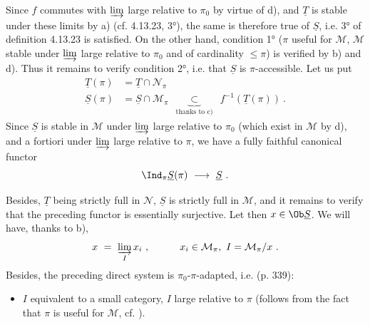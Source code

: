 Since $f$ commutes with $\varinjlim$ large relative to $\pi_0$ by virtue of d), and $\underline{T}$ is stable under these limits by a) (cf. 4.13.23, 3°), the same is therefore true of $\underline{S}$, i.e. 3° of definition 4.13.23 is satisfied. On the other hand, condition 1° ($\pi$ useful for $\mathcal{M}$, $\mathcal{M}$ stable under $\varinjlim$ large relative to $\pi_0$ and of cardinality $\leqslant\pi$) is verified by b) and d). Thus it remains to verify condition 2°, i.e. that $\underline{S}$ is $\pi$-accessible. Let us put
\[
\begin{aligned}
\underline{T}(\pi) &= \underline{T}\cap\mathcal{N}_\pi\\
\underline{S}(\pi) &= \underline{S}\cap\mathcal{M}_\pi\ \ \underbrace{\ \subset\ }_{\text{thanks to c)}}\ \ f^{-1}(\underline{T}(\pi))\ .
\end{aligned}
\]
Since $\underline{S}$ is stable in $\mathcal{M}$ under $\varinjlim$ large relative to $\pi_0$ (which exist in $\mathcal{M}$ by d), and a fortiori under $\varinjlim$ large relative to $\pi$, we have a fully faithful canonical functor
\[ \Ind_\pi\underline{S}(\pi)\ \longrightarrow\ \underline{S}\ . \]

Besides, $\underline{T}$ being strictly full in $\mathcal{N}$, $\underline{S}$ is strictly full in $\mathcal{M}$, and it remains to verify that the preceding functor is essentially surjective. Let then $x\in\Ob\underline{S}$. We will have, thanks to b),
\[ x\ =\ \varinjlim_{I}x_i\ ,\qquad\quad x_i\in\mathcal{M}_\pi,\ I=\mathcal{M}_\pi/x\ . \]
Besides, the preceding direct system is $\pi_0$-$\pi$-adapted, i.e. (p. 339):
\begin{itemize}[leftmargin=2.5em]
\item[1)] $I$ equivalent to a small category, $I$ large relative to $\pi$ (follows from the fact that $\pi$ is useful for $\mathcal{M}$, cf.\,\,).
\end{itemize}